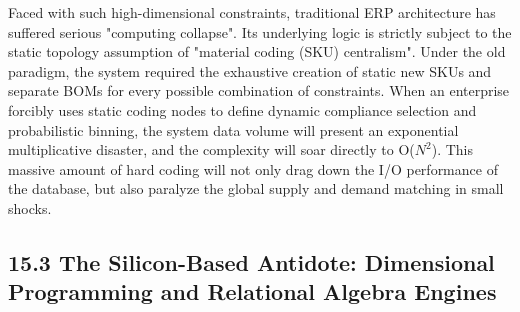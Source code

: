\documentclass[11pt,a4paper]{article}
\begin{document}
Faced with such high-dimensional constraints, traditional ERP architecture has suffered serious "computing collapse". Its underlying logic is strictly subject to the static topology assumption of "material coding (SKU) centralism". Under the old paradigm, the system required the exhaustive creation of static new SKUs and separate BOMs for every possible combination of constraints. When an enterprise forcibly uses static coding nodes to define dynamic compliance selection and probabilistic binning, the system data volume will present an exponential multiplicative disaster, and the complexity will soar directly to O($N^2$). This massive amount of hard coding will not only drag down the I/O performance of the database, but also paralyze the global supply and demand matching in small shocks.


\subsection*{15.3 The Silicon-Based Antidote: Dimensional Programming and Relational Algebra Engines}
\end{document}
